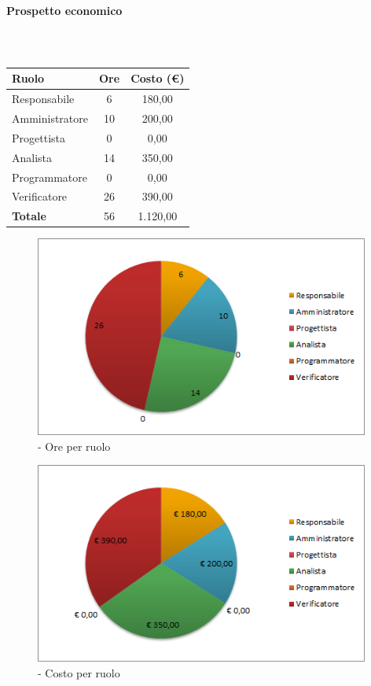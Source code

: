 \documentclass[../PianoDiProgetto.tex]{subfiles}
\begin{document}
\vspace{35 mm}	
	
	\paragraph{Prospetto economico}\
	
					\begin{table}[H]
		\centering
	
		\begin{tabular}{l * {2}{c}}
			\toprule
			\textbf{Ruolo} & \textbf{Ore} & \textbf{Costo (\euro{})} \\
			\midrule
			Responsabile &	6 & 180,00 \\
			Amministratore & 10 & 200,00 \\
			Progettista & 0 & 0,00 \\
			Analista & 14 & 350,00 \\
			Programmatore & 0 & 0,00 \\
			Verificatore & 26 & 390,00 \\
			\midrule		
			\textbf{Totale} & 56 & 1.120,00 \\
			\bottomrule 
		\end{tabular}
		\caption{\PerAD}
	\end{table}
\vfill
\newpage
	
	\begin{figure}[H]
		\centering
		\includegraphics[width=11cm, trim=1cm 0cm 1cm 0cm]{grafici/AD-ruolo}
			\caption{\PerAD{} - Ore per ruolo}
	\end{figure}
\vfill
	\begin{figure}[H]
		\centering
		\includegraphics[width=11cm, trim=1cm 0cm 1cm 0cm]{grafici/AD-costo}
			\caption{\PerAD{} - Costo per ruolo}
	\end{figure}
\vfill		
\newpage	
\end{document}
